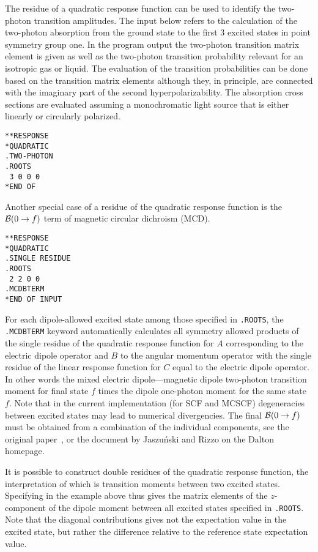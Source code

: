 The residue of a quadratic response function can be used to identify
the two-photon transition amplitudes. The input below refers to the
calculation of the two-photon absorption from the ground state to the
first 3 excited states in point symmetry group one. In the program
output the two-photon transition matrix element is given as well as
the two-photon transition probability relevant for an isotropic gas or
liquid. The evaluation of the transition probabilities can be done based
on the transition matrix elements although they, in principle, are
connected with the imaginary part of the second
hyperpolarizability. The absorption cross sections are evaluated
assuming a monochromatic light source that is either linearly or
circularly polarized.
\begin{verbatim}
**RESPONSE
*QUADRATIC
.TWO-PHOTON
.ROOTS
 3 0 0 0
*END OF
\end{verbatim}

Another special case of a residue of the quadratic response function 
is the ${\cal{B}}(0\to f)$ term of magnetic circular dichroism (MCD).
\begin{verbatim}
**RESPONSE
*QUADRATIC
.SINGLE RESIDUE
.ROOTS
 2 2 0 0
.MCDBTERM
*END OF INPUT
\end{verbatim}
For each dipole-allowed excited state among those specified in 
{\tt .ROOTS}, the {\tt .MCDBTERM} keyword automatically 
calculates all symmetry allowed products of the single residue of the 
quadratic response function for $A$ corresponding to the electric dipole
operator and $B$ to the angular momentum operator with the single residue 
of the linear response function for $C$ equal to the electric dipole operator.
In other words the mixed electric dipole---magnetic dipole two-photon
transition moment
for final state $f$ times the dipole one-photon moment for the same state $f$.
Note that in the current implementation (for SCF and MCSCF) degeneracies between
excited states may lead to numerical divergencies. 
The final ${\cal{B}}(0\to f)$ must be obtained from a combination 
of the individual components, see the original paper~\cite{Coriani:MCDRSP},
or the document by Jaszu\'{n}ski and Rizzo on the Dalton
homepage. 

It is possible to construct double
residues of the quadratic
response function, the interpretation of which is transition
moments
between two 
excited states. Specifying  in the example above thus gives
the matrix elements of the $z$-component of the dipole moment between
all excited states specified in {\tt .ROOTS}. Note that the diagonal contributions
gives  not the expectation value in the excited state, but rather the
difference relative to the reference state expectation value.

